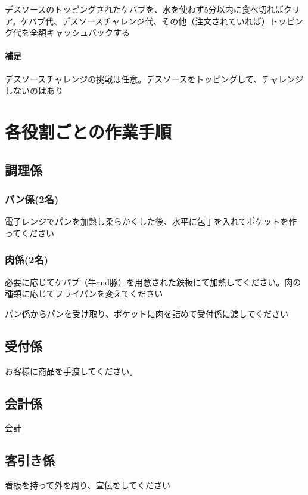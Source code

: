 \documentclass[10pt,a4paper]{jarticle}
\begin{document}
デスソースのトッピングされたケバブを、水を使わず5分以内に食べ切ればクリア。ケバブ代、デスソースチャレンジ代、その他（注文されていれば）トッピング代を全額キャッシュバックする

\paragraph{補足}
デスソースチャレンジの挑戦は任意。デスソースをトッピングして、チャレンジしないのはあり


\section{各役割ごとの作業手順}
\subsection{調理係}
\subsubsection{パン係(2名)}
電子レンジでパンを加熱し柔らかくした後、水平に包丁を入れてポケットを作ってください
\subsubsection{肉係(2名)}
必要に応じてケバブ（牛and豚）を用意された鉄板にて加熱してください。肉の種類に応じてフライパンを変えてください

パン係からパンを受け取り、ポケットに肉を詰めて受付係に渡してください

\subsection{受付係}
お客様に商品を手渡してください。

\subsection{会計係}
会計

\subsection{客引き係}
看板を持って外を周り、宣伝をしてください
\end{document}
